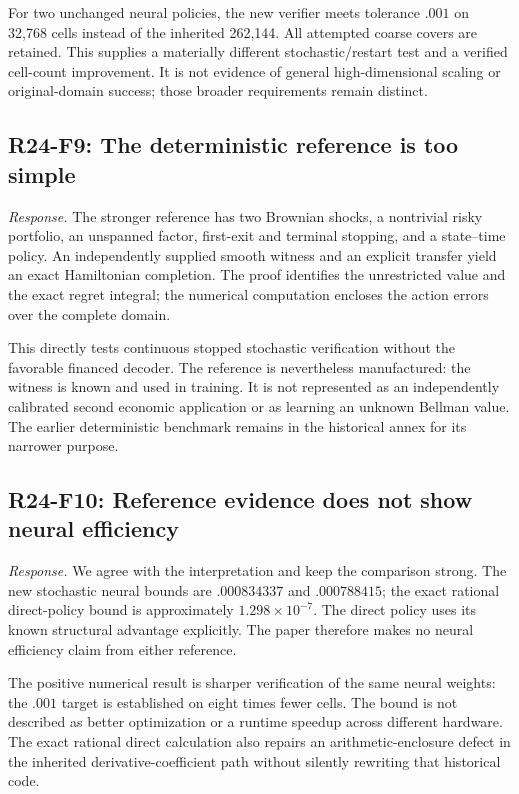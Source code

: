 For two unchanged neural policies, the new verifier meets tolerance $.001$ on 32,768 cells instead of the inherited 262,144. All attempted coarse covers are retained. This supplies a materially different stochastic/restart test and a verified cell-count improvement. It is not evidence of general high-dimensional scaling or original-domain success; those broader requirements remain distinct.

\subsection{R24-F9: The deterministic reference is too simple}
\emph{Response.} The stronger reference has two Brownian shocks, a nontrivial risky portfolio, an unspanned factor, first-exit and terminal stopping, and a state--time policy. An independently supplied smooth witness and an explicit transfer yield an exact Hamiltonian completion. The proof identifies the unrestricted value and the exact regret integral; the numerical computation encloses the action errors over the complete domain.

This directly tests continuous stopped stochastic verification without the favorable financed decoder. The reference is nevertheless manufactured: the witness is known and used in training. It is not represented as an independently calibrated second economic application or as learning an unknown Bellman value. The earlier deterministic benchmark remains in the historical annex for its narrower purpose.

\subsection{R24-F10: Reference evidence does not show neural efficiency}
\emph{Response.} We agree with the interpretation and keep the comparison strong. The new stochastic neural bounds are $.000834337$ and $.000788415$; the exact rational direct-policy bound is approximately $1.298\times10^{-7}$. The direct policy uses its known structural advantage explicitly. The paper therefore makes no neural efficiency claim from either reference.

The positive numerical result is sharper verification of the same neural weights: the $.001$ target is established on eight times fewer cells. The bound is not described as better optimization or a runtime speedup across different hardware. The exact rational direct calculation also repairs an arithmetic-enclosure defect in the inherited derivative-coefficient path without silently rewriting that historical code.

